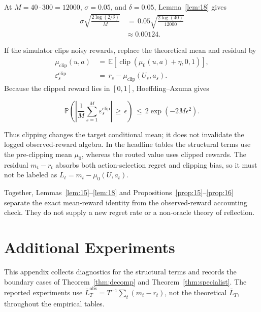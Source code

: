 \documentclass{article} %
\begin{document}
At \(M=40\cdot300=12000\), \(\sigma=0.05\), and \(\delta=0.05\),
Lemma~\ref{lem:18} gives
\begin{equation}
\begin{aligned}
\sigma\sqrt{\frac{2\log(2/\delta)}{M}}
&\,=\,
0.05\sqrt{\frac{2\log(40)}{12000}}
\\
&\approx
0.00124.
\end{aligned}
\end{equation}

If the simulator clips noisy rewards, replace the theoretical mean and
residual by
\begin{equation}
\begin{aligned}
\mu_{\mathrm{clip}}(u,a)
&\,=\,
\mathbb{E}\!\left[
\operatorname{clip}\!\left(\mu_0(u,a)+\eta,0,1\right)
\right],
\\
\varepsilon^{\mathrm{clip}}_s
&\,=\,
r_s-\mu_{\mathrm{clip}}(U_s,a_s).
\end{aligned}
\end{equation}
Because the clipped reward lies in \([0,1]\), Hoeffding--Azuma gives

\begin{equation}
\label{eq:app-six-clipped-tail}
\mathbb{P}\!\left(
\left|
\frac{1}{M}\sum_{s=1}^{M}\varepsilon^{\mathrm{clip}}_s
\right|
\,\ge\,
\epsilon
\right)
\,\le\,
2\exp(-2M\epsilon^2).
\end{equation}

Thus clipping changes the target conditional mean; it does not invalidate the
logged observed-reward algebra. In the headline tables the structural terms use
the pre-clipping mean \(\mu_0\), whereas the routed value uses clipped rewards.
The residual \(m_t-r_t\) absorbs both action-selection regret and clipping
bias, so it must not be labeled as \(L_t=m_t-\mu_0(U,a_t)\).

Together, Lemmas~\ref{lem:15}--\ref{lem:18} and
Propositions~\ref{prop:15}--\ref{prop:16} separate the exact mean-reward
identity from the observed-reward accounting check. They do not supply a new
regret rate or a non-oracle theory of reflection.

\section{Additional Experiments}

\label{app:experiments}

This appendix collects diagnostics for the structural terms and records the
boundary cases of Theorem~\ref{thm:decomp} and
Theorem~\ref{thm:specialist}. The reported experiments use
\(\bar L_T^{\mathrm{obs}}=T^{-1}\sum_t(m_t-r_t)\), not the theoretical
\(\bar L_T\), throughout the empirical tables.
\end{document}
